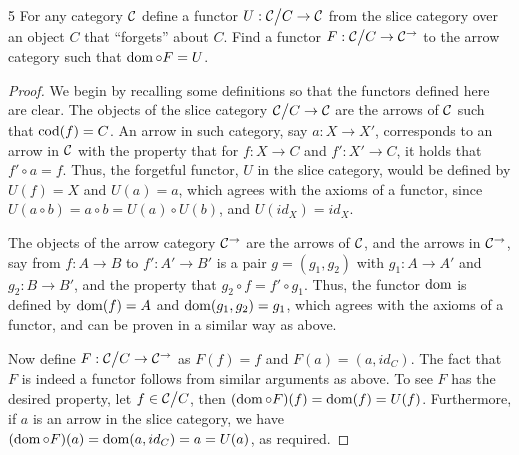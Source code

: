 \begin{exercise}{5}
For any category $\mathcal{C}$ define a functor $U: {\textstyle \mathcal{C}}\big/{\textstyle C} \to \mathcal{C}$ from the slice category over an object $C$ that ``forgets'' about $C$.
Find a functor $F: {\textstyle \mathcal{C}}\big/{\textstyle C} \to \mathcal{C}^\to$ to the arrow category such that $\operatorname{dom} \circ F = U$.
\end{exercise}
\begin{proof}
We begin by recalling some definitions so that the functors defined here are clear. 
The objects of the slice category ${\textstyle \mathcal{C}}\big/{\textstyle C} \to \mathcal{C}$ are the arrows of $\mathcal{C}$ such that $\operatorname{cod}(f) = C$.
An arrow in such category, say $a: X \to X'$, corresponds to an arrow in $\mathcal{C}$ with the property that for $f: X \to C$ and $f': X' \to C$, it holds that $f' \circ a = f$.
Thus, the forgetful functor, $U$ in the slice category, would be defined by $U(f) = X$ and $U(a) = a$, which agrees with the axioms of a functor, since $U(a \circ b) = a \circ b = U(a) \circ U(b)$, and $U(id_X) = id_X$.

The objects of the arrow category $\mathcal{C}^\to$ are the arrows of $\mathcal{C}$, and the arrows in $\mathcal{C}^\to$, say from $f: A \to B$ to $f': A' \to B'$ is a pair $g = (g_1, g_2)$ with $g_1: A \to A'$ and $g_2: B \to B'$, and the property that $g_2 \circ f = f' \circ g_1$.
Thus, the functor $\operatorname{dom}$ is defined by $\operatorname{dom}(f) = A$ and $\operatorname{dom}(g_1, g_2) = g_1$, which agrees with the axioms of a functor, and can be proven in a similar way as above.

Now define $F: {\textstyle \mathcal{C}}\big/{\textstyle C} \to \mathcal{C}^\to$ as $F(f) = f$ and $F(a) = (a, id_C)$.
The fact that $F$ is indeed a functor follows from similar arguments as above.
To see $F$ has the desired property, let $f \in {\textstyle \mathcal{C}}\big/{\textstyle C}$, then $(\operatorname{dom} \circ F)(f) = \operatorname{dom}(f) = U(f)$.
Furthermore, if $a$ is an arrow in the slice category, we have $(\operatorname{dom} \circ F)(a) = \operatorname{dom}(a, id_C) = a = U(a)$, as required.
\end{proof} 

